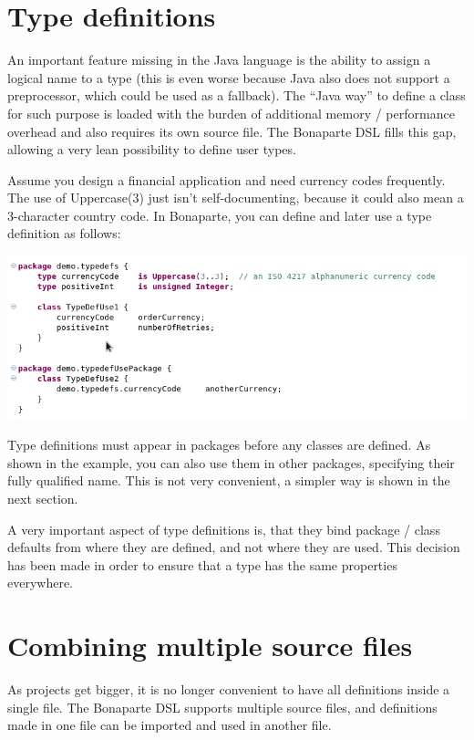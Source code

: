 \documentclass[11pt,a4paper,oneside]{article}
\begin{document}
\section{Type definitions}
An important feature missing in the Java language is the ability to assign a logical name to a type (this is even worse because Java also does not support a preprocessor,
which could be used as a fallback). The ``Java way'' to define a class for such purpose is loaded with the burden of additional memory / performance overhead
and also requires its own source file. The Bonaparte DSL fills this gap, allowing a very lean possibility to define user types.

Assume you design a financial application and need currency codes frequently. The use of {\ttfamily Uppercase(3)} just isn't self-documenting, because it could
also mean a 3-character country code.
In Bonaparte, you can define and later use a type definition as follows:

\vspace{2mm}

\hspace{1cm}\includegraphics[scale=0.5]{images/tut1-010-typedefs.png}

\noindent 
Type definitions must appear in packages before any classes are defined. As shown in the example, you can also use them in other packages,
specifying their fully qualified name. This is not very convenient, a simpler way is shown in the next section.

A very important aspect of type definitions is, that they bind package / class defaults from where they are defined, and not where they are used.
This decision has been made in order to ensure that a type has the same properties everywhere. 
 
 
\section{Combining multiple source files}
As projects get bigger, it is no longer convenient to have all definitions inside a single file.
The Bonaparte DSL supports multiple source files, and definitions made in one file can be imported and used in another file.
\end{document}
